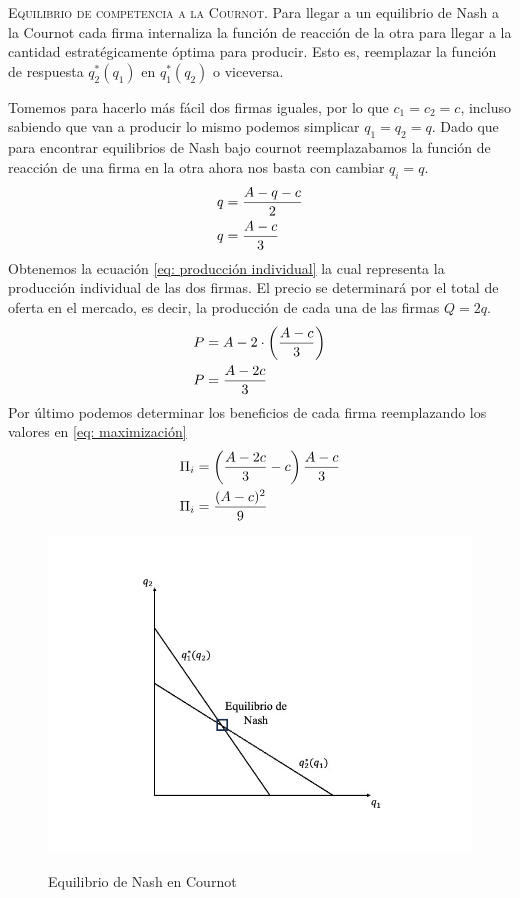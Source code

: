 \textsc{Equilibrio de competencia a la Cournot}. Para llegar a un equilibrio de Nash a la Cournot cada firma internaliza la función de reacción de la otra para llegar a la cantidad estratégicamente óptima para producir. Esto es, reemplazar la función de respuesta $q^*_2(q_1)$ en $q^*_1(q_2)$ o viceversa. 

Tomemos para hacerlo más fácil dos firmas iguales, por lo que $c_1 = c_2 = c$, incluso sabiendo que van a producir lo mismo podemos simplicar $q_1 = q_2 = q$. Dado que para encontrar equilibrios de Nash bajo cournot reemplazabamos la función de reacción de una firma en la otra ahora nos basta con cambiar $q_i = q$. 
\begin{align}
    q &= \frac{A-q-c}{2} \notag \\
    q &= \frac{A-c}{3} \label{eq: producción individual}
\end{align}
Obtenemos la ecuación \ref{eq: producción individual} la cual representa la producción individual de las dos firmas. El precio se determinará por el total de oferta en el mercado, es decir, la producción de cada una de las firmas $Q = 2q$. 
\begin{align}
    P &= A-2 \cdot \left( \frac{A-c}{3} \right) \notag \\
    P &= \frac{A-2c}{3}
\end{align}
Por último podemos determinar los beneficios de cada firma reemplazando los valores en \ref{eq: maximización}
\begin{align}
\Pi_i &= \left(\frac{A-2c}{3}-c \right) \frac{A-c}{3} \notag \\ 
\Pi_i &= \frac{(A-c)^2}{9}
\end{align}

\begin{figure}[htb]
    \centering
    \caption{Equilibrio de Nash en Cournot}
    \centering
    \includegraphics[width=12cm]{Figuras/EN Cournot.jpeg}
    \label{fig:EN Cournot}
\end{figure}

